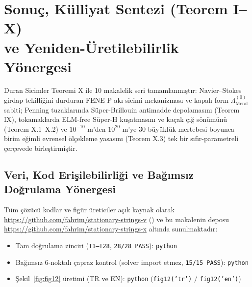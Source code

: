 \documentclass[12pt,a4paper]{article}
\begin{document}
\clearpage

\section[Sonuç, Külliyat Sentezi ve Yeniden-Üretilebilirlik]{Sonuç, Külliyat Sentezi (Teorem I--X) \\ ve Yeniden-Üretilebilirlik Yönergesi}

Duran Sicimler Teoremi X ile 10 makalelik seri tamamlanmıştır: Navier--Stokes girdap tekilliğini durduran FENE-P akı-sicimi mekanizması ve kapalı-form $\Lambda_{\mathrm{Meral}}^{(0)}$ sabiti; Penning tuzaklarında Süper-Brillouin antimadde depolamasını (Teorem IX), tokamaklarda ELM-free Süper-H kuşatmasını ve kaçak çığ sönümünü (Teorem X.1--X.2) ve $10^{-10}\text{ m}$'den $10^{20}\text{ m}$'ye 30 büyüklük mertebesi boyunca birim eğimli evrensel ölçekleme yasasını (Teorem X.3) tek bir sıfır-parametreli çerçevede birleştirmiştir.

\subsection*{Veri, Kod Erişilebilirliği ve Bağımsız Doğrulama Yönergesi}
Tüm çözücü kodlar ve figür üreticiler açık kaynak olarak \url{https://github.com/fahrim/stationary-strings-v} () ve bu makalenin deposu \url{https://github.com/fahrim/stationary-strings-x} altında sunulmaktadır:
\begin{itemize}
    \item Tam doğrulama zinciri (\texttt{T1--T28}, \texttt{28/28 PASS}): \texttt{python} 
    \item Bağımsız 6-noktalı çapraz kontrol (solver import etmez, \texttt{15/15 PASS}): \texttt{python} 
    \item Şekil~\ref{fig:fig12} üretimi (TR ve EN): \texttt{python}  (\texttt{fig12('tr')} / \texttt{fig12('en')})
\end{itemize}
\end{document}
